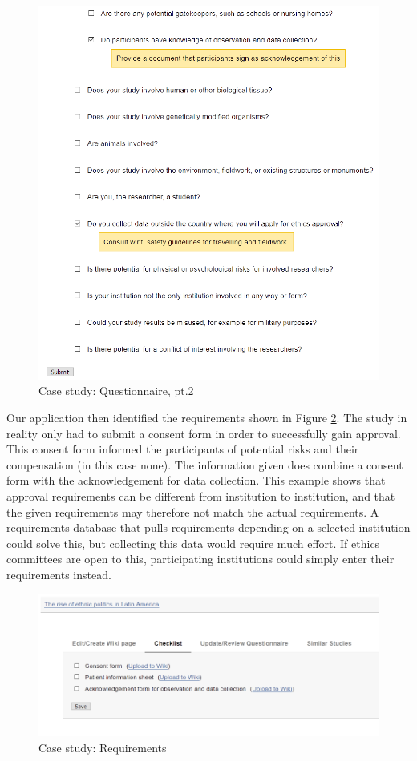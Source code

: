 \documentclass[10pt]{article}
\begin{document}
\begin{figure}[H]
\centering

	\includegraphics[width=1\textwidth]{img/2.png}
	\caption{Case study: Questionnaire, pt.2}
	\label{fig:2}
\end{figure}

Our application then identified the requirements shown in Figure \ref{fig:3}. The study in reality only had to submit a consent form in order to successfully gain approval. This consent form informed the participants of potential risks and their compensation (in this case none). The information given does combine a consent form with the acknowledgement for data collection. This example shows that approval requirements can be different from institution to institution, and that the given requirements may therefore not match the actual requirements. A requirements database that pulls requirements depending on a selected institution could solve this, but collecting this data would require much effort. If ethics committees are open to this, participating institutions could simply enter their requirements instead.
\begin{figure}[H]
\centering
	\includegraphics[width=1\textwidth]{img/3.png}
	\caption{Case study: Requirements}
	\label{fig:3}
\end{figure}
\end{document}
